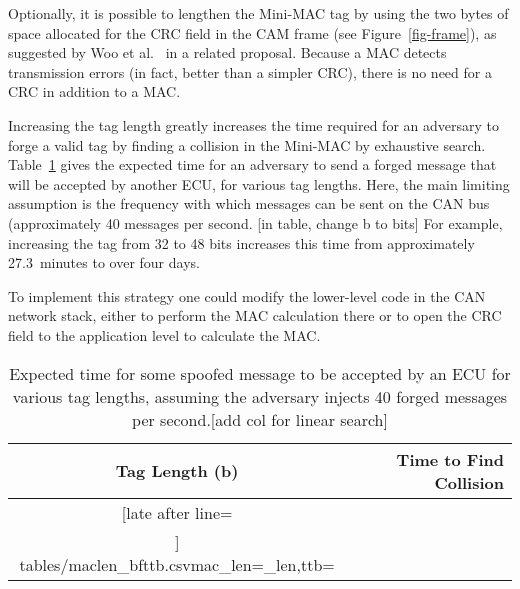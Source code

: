 Optionally, it is possible to lengthen the Mini-MAC tag by 
using the two bytes of space allocated for the CRC field in the CAM frame (see Figure~\ref{fig-frame}),
as suggested by Woo et al.~\cite{Woo-14} in a related proposal.
Because a MAC detects transmission errors (in fact, better than a simpler CRC), there is no need for
a CRC in addition to a MAC.  

Increasing the tag length greatly increases the time required for an adversary to forge a valid tag by
finding a collision in the Mini-MAC by exhaustive search.  
Table~\ref{tab-taglength} gives the expected time for an adversary to send a forged message 
that will be accepted by another ECU, for various tag lengths.  Here, the main limiting assumption is 
the frequency with which messages can be sent on the CAN bus 
(approximately 40 messages per second. [in table, change b to bits]
For example, increasing the tag from 32 to 48 bits increases this time from
approximately 27.3~minutes to over four days.


To implement this strategy one could modify the lower-level code in the CAN network stack, 
either to perform the MAC calculation there 
or to open the CRC field to the application level to calculate the MAC.


	\begin{table}	
	\centering
	\caption{Expected time for some spoofed message to be accepted by an ECU for various tag lengths, 
	assuming the adversary injects 40 forged messages per second.[add col for linear search]}
	\label{tab-taglength}
	\vspace{8pt}
	\begin{tabular}{c|r}%
	\bfseries Tag Length (b) & \bfseries Time to Find Collision\\\hline \csvreader[late after line=\\]%
		{tables/maclen_bfttb.csv}{mac_len=\mac_len,ttb=\ttb}%
		{\mac_len & \ttb}%
	\end{tabular}
	\end{table}
	
